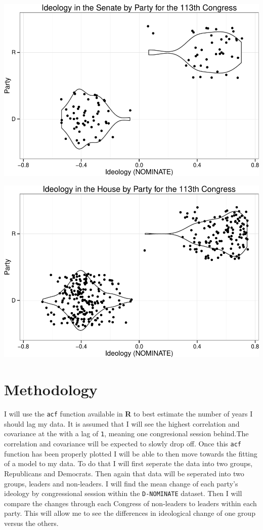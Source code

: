 \documentclass[12pt,twoside]{reedthesis}
\begin{document}
  \begin{center}\includegraphics{trautlein_thesis_files/figure-latex/violin_113_senate-1} \end{center}
  
  \begin{center}\includegraphics{trautlein_thesis_files/figure-latex/violin_113_house-1} \end{center}
  
  \chapter{Methodology}\label{methodology}
  
  I will use the \texttt{acf} function available in \textbf{R} to best
  estimate the number of years I should lag my data. It is assumed that I
  will see the highest correlation and covariance at the with a lag of
  \texttt{1}, meaning one congresional session behind.The correlation and
  covariance will be expected to slowly drop off. Once this \texttt{acf}
  function has been properly plotted I will be able to then move towards
  the fitting of a model to my data. To do that I will first seperate the
  data into two groups, Republicans and Democrats. Then again that data
  will be seperated into two groups, leaders and non-leaders. I will find
  the mean change of each party's ideology by congressional session within
  the \texttt{D-NOMINATE} dataset. Then I will compare the changes through
  each Congress of non-leaders to leaders within each party. This will
  allow me to see the differences in ideological change of one group
  versus the others.
  
\end{document}
